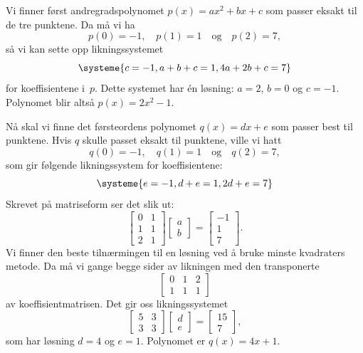 \documentclass[notitlepage,a4paper,12pt,norsk]{IMFeksamen}
\newcommand{\0}{\V{0}}
\newcommand{\oppgslutt}{
\begin{center}
\pgfornament[width=6cm]{88}
\end{center}
}
\newenvironment{losning}{\begin{oppgave}}{\oppgslutt\end{oppgave}}
\begin{document}
\begin{losning}
Vi finner først andregradspolynomet
$p(x)=ax^2+bx+c$
som passer eksakt til de tre punktene.
Da må vi ha
\[
p(0) = -1,\quad
p(1) = 1\quad
\text{og}\quad
p(2) = 7,
\]
så vi kan sette opp likningssystemet
\[
\systeme{
c=-1,
a+b+c=1,
4a+2b+c=7
}
\]
for koeffisientene i~$p$.
Dette systemet har én løsning: $a=2$, $b=0$ og $c=-1$.
Polynomet blir altså $p(x) = 2x^2 - 1$. 

Nå skal vi finne det førsteordens polynomet
$q(x) = dx + e$
som passer best til punktene.
Hvis $q$ skulle passet eksakt til punktene, ville vi hatt
\[
q(0) = -1,\quad
q(1) = 1\quad
\text{og}\quad
q(2) = 7,
\]
som gir følgende likningssystem for koeffisientene:
\[
\systeme{
e=-1,
d+e=1,
2d+e=7
}
\]
Skrevet på matriseform ser det slik ut:
\[
\begin{bmatrix}
0 & 1  \\
1 & 1  \\
2 & 1 
\end{bmatrix}
\begin{bmatrix}
a  \\
b 
\end{bmatrix}
=
\begin{bmatrix}
-1  \\
1  \\
7
\end{bmatrix}.
\]
Vi finner den beste tilnærmingen til en løsning ved å bruke
minste kvadraters metode.
Da må vi gange begge sider av likningen med den transponerte
\[
\begin{bmatrix}
0 & 1 & 2 \\
1 & 1 & 1
\end{bmatrix}
\]
av koeffisientmatrisen.  Det gir oss likningssystemet
\[
\begin{bmatrix}
5 & 3  \\
3 & 3 
\end{bmatrix}
\begin{bmatrix}
d  \\
e 
\end{bmatrix}
=
\begin{bmatrix}
15  \\
7
\end{bmatrix},
\]
som har løsning $d=4$ og $e=1$. Polynomet er $q(x) = 4x + 1$.
\begin{center}
\end{center}
\end{losning}
\end{document}
